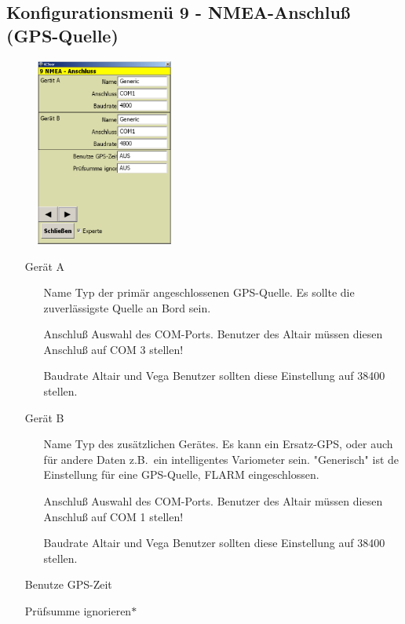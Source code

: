 \subsection{Konfigurationsmenü 9 - NMEA-Anschluß (GPS-Quelle)}\label{Konfig9}
\begin{figure}
\includegraphics[width=4.5cm]{Bilder/Konfig9NMEAAnschluss.png}
\end{figure}
\begin{enumerate}
\item[Gerät A]
\begin{itemize}
\item[Name] Typ der primär angeschlossenen \textsf{GPS}-Quelle. Es sollte die zuverlässigste Quelle an Bord sein.
\item[Anschluß] Auswahl des COM-Ports. Benutzer des \textsf{Altair} müssen diesen Anschluß auf COM 3 stellen!
\item[Baudrate]\textsf{Altair} und \textsf{Vega} Benutzer sollten diese Einstellung auf 38400 stellen.
\end{itemize}
\item[Gerät B]
\begin{itemize}
\item[Name] Typ des zusätzlichen Gerätes. Es kann ein Ersatz-GPS, oder auch für andere Daten z.B.\ ein intelligentes Variometer sein.
    "Generisch" ist de Einstellung für eine \textsf{GPS}-Quelle, FLARM eingeschlossen.
\item[Anschluß]Auswahl des COM-Ports.  Benutzer des \textsf{Altair} müssen diesen Anschluß auf COM 1 stellen!
\item[Baudrate]\textsf{Altair} und \textsf{Vega} Benutzer sollten diese Einstellung auf 38400 stellen.
\end{itemize}
\item[Benutze \textsf{GPS}-Zeit]
\item[Prüfsumme ignorieren$\ast$]
\end{enumerate}



